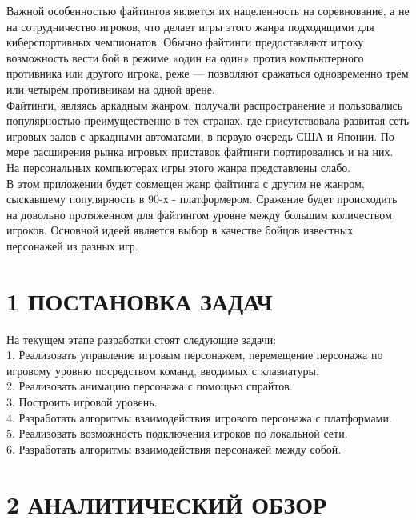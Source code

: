 \documentclass[14pt,a4paper]{extreport}
\begin{document}
Важной особенностью файтингов является их нацеленность на соревнование, а не на сотрудничество игроков, что делает игры этого жанра подходящими для киберспортивных чемпионатов. Обычно файтинги предоставляют игроку возможность вести бой в режиме «один на один» против компьютерного противника или другого игрока, реже — позволяют сражаться одновременно трём или четырём противникам на одной арене.\\

Файтинги, являясь аркадным жанром, получали распространение и пользовались популярностью преимущественно в тех странах, где присутствовала развитая сеть игровых залов с аркадными автоматами, в первую очередь США и Японии. По мере расширения рынка игровых приставок файтинги портировались и на них. На персональных компьютерах игры этого жанра представлены слабо.\\

	В этом приложении будет совмещен жанр файтинга с другим не жанром, сыскавшему популярность в 90-х - платформером. Сражение будет происходить на довольно протяженном для файтингом уровне между большим количеством игроков. Основной идеей является выбор в качестве бойцов известных персонажей из разных игр.

	\newpage
	\section*{\normalsize\hspace{4ex}1 ПОСТАНОВКА ЗАДАЧ}
	\hspace{4ex}На текущем этапе разработки стоят следующие задачи:
	\\1. Реализовать управление игровым персонажем, перемещение персонажа по игровому уровню посредством команд, вводимых с клавиатуры. 
	\\2. Реализовать анимацию персонажа с помощью спрайтов. 
	\\3. Построить игровой уровень.
	\\4. Разработать алгоритмы взаимодействия игрового персонажа с платформами. 
	\\5. Реализовать возможность подключения игроков по локальной сети.
	\\6. Разработать алгоритмы взаимодействия персонажей между собой.

	\newpage
	\section*{\normalsize\hspace{4ex}2 АНАЛИТИЧЕСКИЙ ОБЗОР}
\end{document}
